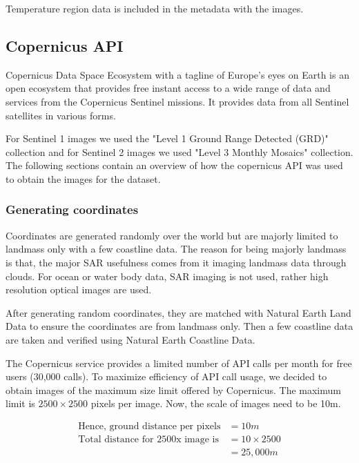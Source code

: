 Temperature region data is included in the metadata with the images.

\subsection{Copernicus API}

Copernicus Data Space Ecosystem with a tagline of Europe's eyes on Earth is an open ecosystem that provides free instant access to a wide range of data and services from the Copernicus Sentinel missions\cite{copernicusHome}. It provides data from all Sentinel satellites in various forms.

For Sentinel 1 images we used the "Level 1 Ground Range Detected (GRD)" collection and for Sentinel 2 images we used "Level 3 Monthly Mosaics" collection. The following sections contain an overview of how the copernicus API was used to obtain the images for the dataset.

\subsubsection{Generating coordinates}

Coordinates are generated randomly over the world but are majorly limited to landmass only with a few coastline data. The reason for being majorly landmass is that, the major SAR usefulness comes from it imaging landmass data through clouds. For ocean or water body data, SAR imaging is not used, rather high resolution optical images are used.

After generating random coordinates, they are matched with Natural Earth Land Data\cite{naturalearthland} to ensure the coordinates are from landmass only. Then a few coastline data are taken and verified using Natural Earth Coastline Data\cite{naturalearthcoast}.

The Copernicus service provides a limited number of API calls per month for free users (30,000 calls). To maximize efficiency of API call usage, we decided to obtain images of the maximum size limit offered by Copernicus. The maximum limit is $2500\times2500$ pixels per image. Now, the scale of images need to be 10m.

\begin{align*}
    \text{Hence, ground distance per pixels} &= 10m \\
    \text{Total distance for 2500x image is} &= 10\times2500 \\
    &= 25,000m
\end{align*}

